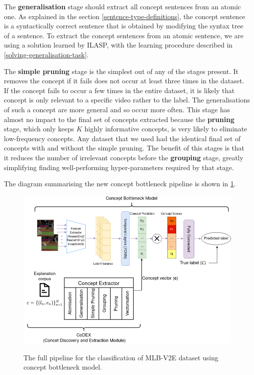 The \textbf{generalisation} stage should extract all concept sentences from an atomic one. 
As explained in the section \ref{sentence-type-definitions}, the concept sentence is a syntactically correct sentence that is obtained by modifying the syntax tree of a sentence.
To extract the concept sentences from an atomic sentence, we are using a solution learned by ILASP, with the learning procedure described in \ref{solving-generalisation-task}.

The \textbf{simple pruning} stage is the simplest out of any of the stages present. 
It removes the concept if it fails does not occur at least three times in the dataset.
If the concept fails to occur a few times in the entire dataset, it is likely that concept is only relevant to a specific video rather to the label. 
The generalisations of such a concept are more general and so occur more often.
This stage has almost no impact to the final set of concepts extracted because the \textbf{pruning} stage, which only keeps $K$ highly informative concepts, is very likely to eliminate low-frequency concepts.
Any dataset that we used had the identical final set of concepts with and without the simple pruning.
The benefit of this stages is that it reduces the number of irrelevant concepts before the \textbf{grouping} stage, greatly simplifying finding well-performing hyper-parameters required by that stage.

The diagram summarising the new concept bottleneck pipeline is shown in \ref{full-architecture-diagram}.

\begin{figure}[h]
\caption{The full pipeline for the classification of MLB-V2E dataset using concept bottleneck model.} 
\centering
\includegraphics[width=\textwidth]{concept-bottleneck-pipeline/new-concept-bottleneck-pipeline.png}
\label{full-architecture-diagram}
\end{figure}


